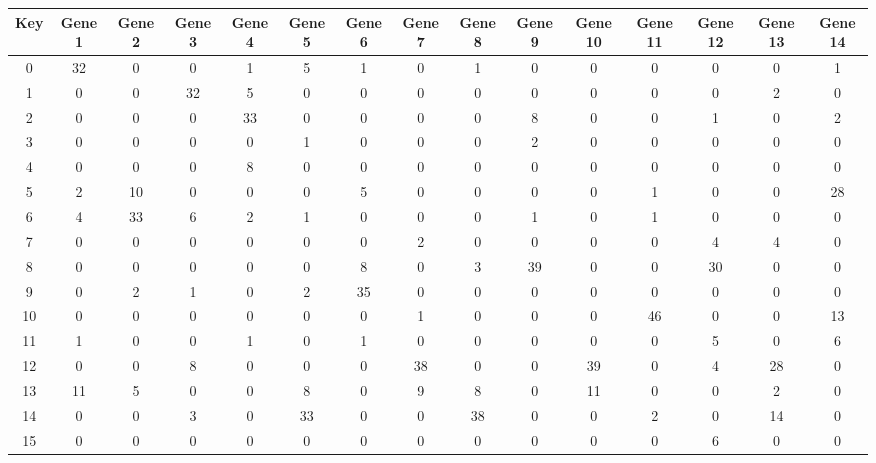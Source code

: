 \begin{tabular}{|c|c|c|c|c|c|c|c|c|c|c|c|c|c|c|}
\hline
Key & Gene 1 & Gene 2 & Gene 3 & Gene 4 & Gene 5 & Gene 6 & Gene 7 & Gene 8 & Gene 9 & Gene 10 & Gene 11 & Gene 12 & Gene 13 & Gene 14 \\
\hline
0 & 32 & 0 & 0 & 1 & 5 & 1 & 0 & 1 & 0 & 0 & 0 & 0 & 0 & 1 \\
1 & 0 & 0 & 32 & 5 & 0 & 0 & 0 & 0 & 0 & 0 & 0 & 0 & 2 & 0 \\
2 & 0 & 0 & 0 & 33 & 0 & 0 & 0 & 0 & 8 & 0 & 0 & 1 & 0 & 2 \\
3 & 0 & 0 & 0 & 0 & 1 & 0 & 0 & 0 & 2 & 0 & 0 & 0 & 0 & 0 \\
4 & 0 & 0 & 0 & 8 & 0 & 0 & 0 & 0 & 0 & 0 & 0 & 0 & 0 & 0 \\
5 & 2 & 10 & 0 & 0 & 0 & 5 & 0 & 0 & 0 & 0 & 1 & 0 & 0 & 28 \\
6 & 4 & 33 & 6 & 2 & 1 & 0 & 0 & 0 & 1 & 0 & 1 & 0 & 0 & 0 \\
7 & 0 & 0 & 0 & 0 & 0 & 0 & 2 & 0 & 0 & 0 & 0 & 4 & 4 & 0 \\
8 & 0 & 0 & 0 & 0 & 0 & 8 & 0 & 3 & 39 & 0 & 0 & 30 & 0 & 0 \\
9 & 0 & 2 & 1 & 0 & 2 & 35 & 0 & 0 & 0 & 0 & 0 & 0 & 0 & 0 \\
10 & 0 & 0 & 0 & 0 & 0 & 0 & 1 & 0 & 0 & 0 & 46 & 0 & 0 & 13 \\
11 & 1 & 0 & 0 & 1 & 0 & 1 & 0 & 0 & 0 & 0 & 0 & 5 & 0 & 6 \\
12 & 0 & 0 & 8 & 0 & 0 & 0 & 38 & 0 & 0 & 39 & 0 & 4 & 28 & 0 \\
13 & 11 & 5 & 0 & 0 & 8 & 0 & 9 & 8 & 0 & 11 & 0 & 0 & 2 & 0 \\
14 & 0 & 0 & 3 & 0 & 33 & 0 & 0 & 38 & 0 & 0 & 2 & 0 & 14 & 0 \\
15 & 0 & 0 & 0 & 0 & 0 & 0 & 0 & 0 & 0 & 0 & 0 & 6 & 0 & 0 \\
\hline
\end{tabular}